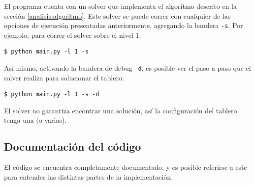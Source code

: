\documentclass[letter,12pt]{article}
\begin{document}
El programa cuenta con un solver que implementa el algoritmo descrito en la sección \ref{analisis:algoritmo}. Este solver se puede correr con cualquier de las opciones de ejecución presentadas anteriormente, agregando la bandera \verb|-s|. Por ejemplo, para correr el solver sobre el nivel 1: \par

\begin{verbatim}
$ python main.py -l 1 -s
\end{verbatim}

Así mismo, activando la bandera de debug \verb|-d|, es posible ver el paso a paso que el solver realiza para solucionar el tablero: \par

\begin{verbatim}
$ python main.py -l 1 -s -d
\end{verbatim}

El solver no garantiza encontrar una solución, así la configuración del tablero tenga una (o varias). \par

\subsection{Documentación del código}

El código se encuentra completamente documentado, y es posible referirse a este para entender las distintas partes de la implementación. \par
\end{document}
